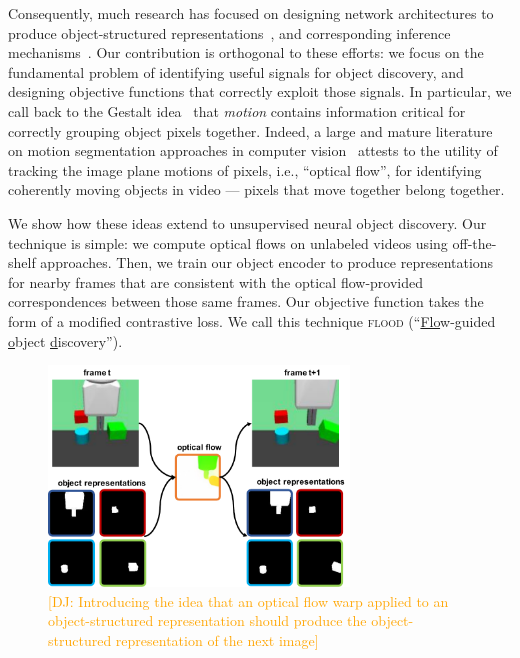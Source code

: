 \documentclass{article}
\newcommand{\jd}[1]{\textcolor{orange}{[DJ: #1]}}
\begin{document}


Consequently, much research has focused on designing network architectures to produce object-structured representations~\cite{jakab2018unsupervised,jakab2020self,Kulkarni2019UnsupervisedLO,lowe2020learning,locatello2020object,crawford2019spatially}, and corresponding inference mechanisms~\cite{eslami2016attend, greff2019multi, engelcke2019genesis}. Our contribution is orthogonal to these efforts: we focus on the fundamental problem of identifying useful signals for object discovery, and designing objective functions that correctly exploit those signals. In particular, we call back to the Gestalt idea~\cite{wertheimer1938laws} that \emph{motion} contains information critical for correctly grouping object pixels together. Indeed, a large and mature literature on motion segmentation approaches in computer vision~\cite{tron2007benchmark,yan2006general,keuper2018motion,bideau2018moa, yang2021rigidmask} attests to the utility of tracking the image plane motions of pixels, i.e., ``optical flow'', for identifying coherently moving objects in video --- pixels that move together belong together.

We show how these ideas extend to unsupervised neural object discovery. Our technique is simple: we compute optical flows on unlabeled videos using off-the-shelf approaches. Then, we train our object encoder to produce representations for nearby frames that are consistent with the optical flow-provided correspondences between those same frames. Our objective function takes the form of a modified contrastive loss. We call this technique \textsc{flood} (``\ul{Flo}w-guided \ul{o}bject \ul{d}iscovery''). 

\begin{figure}
    \centering
    \includegraphics[width=8cm]{flood_main_figure.pdf}
    \caption{\jd{Introducing the idea that an optical flow warp applied to an object-structured representation should produce the object-structured representation of the next image}}
    \label{fig:desired_property}
\end{figure}
\end{document}
